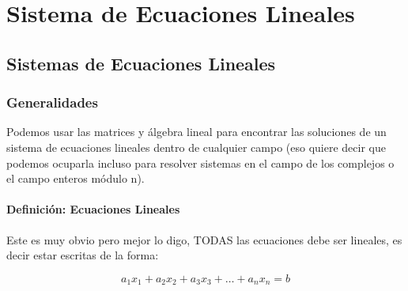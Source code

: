 \documentclass[12pt]{report}                                    %
\begin{document}
\part{Sistema de Ecuaciones Lineales}

    \chapter{Sistemas de Ecuaciones Lineales}
        \clearpage


        \section{Generalidades}

            Podemos usar las matrices y álgebra lineal para encontrar las soluciones
            de un sistema de ecuaciones lineales dentro de cualquier campo (eso quiere
            decir que podemos ocuparla incluso para resolver sistemas en el campo de
            los complejos o el campo enteros módulo n).

            \subsection{Definición: Ecuaciones Lineales}

                Este es muy obvio pero mejor lo digo, TODAS las ecuaciones debe ser lineales,
                es decir estar escritas de la forma:

                \begin{equation}
                    a_1x_1 + a_2x_2 + a_3x_3 + \dots + a_nx_n = b
                \end{equation}
\end{document}
